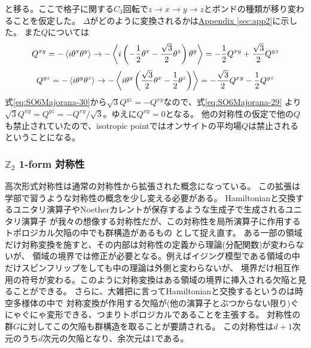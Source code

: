 \documentclass[11pt, aps, longbibliography]{article}
\begin{document}
        と移る。ここで格子に関する$C_3$回転で$z\rightarrow x \rightarrow y \rightarrow z$とボンドの種類が移り変わることを仮定した。
        $\Delta$がどのように変換されるかは\hyperlink{app_Majorana-mf}{Appendix \ref{sec:app2}}に示した。
        また$Q$については
        \begin{equation}\label{eq:SO6Majorana-29}
            Q^{xy} = -\expval{i\theta^x\theta^y} \rightarrow -\expval{i\left( -\frac{1}{2}\theta^x - \frac{\sqrt{3}}{2}\theta^z \right) \theta^y } = -\frac{1}{2}Q^{xy} + \frac{\sqrt{3}}{2}Q^{yz}
        \end{equation}
        \begin{equation}\label{eq:SO6Majorana-30}
            Q^{yz} = -\expval{i\theta^y\theta^z} \rightarrow -\expval{i \theta^y \left( \frac{\sqrt{3}}{2}\theta^x - \frac{1}{2}\theta^z \right)} = -\frac{\sqrt{3}}{2}Q^{xy} - \frac{1}{2}Q^{yz}
        \end{equation}
        式\eqref{eq:SO6Majorana-30}から$\sqrt{3}Q^{yz} = -Q^{xy}$なので、式\eqref{eq:SO6Majorana-29}
        より$\sqrt{3}Q^{xy} = Q^{yz} = -Q^{xy}/\sqrt{3}$。ゆえに$Q^{xy}=0$となる。
        他の対称性の仮定で他の$Q$も禁止されていたので、isotropic pointではオンサイトの平均場$Q$は禁止されるということになる。


        \subsubsection{$\mathbb{Z}_2$ 1-form 対称性}
        高次形式対称性は通常の対称性から拡張された概念になっている。
        この拡張は学部で習うような対称性の概念を少し変える必要がある。
        Hamiltonianと交換するユニタリ演算子やNoetherカレントが保存するような生成子で生成されるユニタリ演算子
        が我々の想像する対称性だが、この対称性を局所演算子に作用するトポロジカル欠陥の中でも群構造があるもの
        として捉え直す。
        ある一部の領域だけ対称変換を施すと、その内部は対称性の定義から理論(分配関数)が変わらないが、
        領域の境界では修正が必要となる。例えばイジング模型である領域の中だけスピンフリップをしても中の理論は外側と変わらないが、
        境界だけ相互作用の符号が変わる。このように対称変換はある領域の境界に挿入される欠陥と見ることができる。
        さらに、大雑把に言ってHamiltonianと交換するというのは時空多様体の中で
        対称変換が作用する欠陥が(他の演算子とぶつからない限り)ぐにゃぐにゃ変形できる、つまりトポロジカルであることを主張する。
        対称性の群$G$に対してこの欠陥も群構造を取ることが要請される。
        この対称性は$d+1$次元のうち$d$次元の欠陥となり、余次元は1である。
\end{document}
